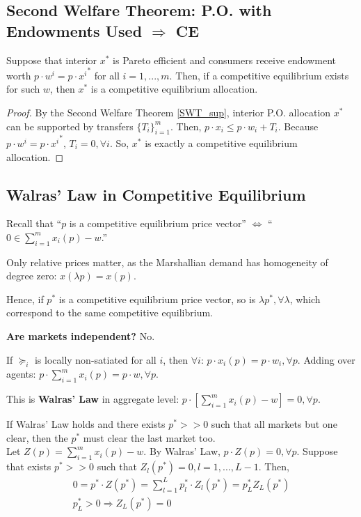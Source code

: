 \documentclass[11pt]{elegantbook}
\begin{document}
\subsection{Second Welfare Theorem: P.O. with Endowments Used $\Rightarrow$ CE}
\begin{theorem}
    Suppose that interior $x^*$ is Pareto efficient and consumers receive endowment worth $p\cdot w^i=p\cdot {x^i}^*$ for all $i=1,...,m$. Then, if a competitive equilibrium exists for such $w$, then $x^*$ is a competitive equilibrium allocation.
\end{theorem}
\begin{proof}
    By the Second Welfare Theorem \ref{SWT_sup}, interior P.O. allocation $x^*$ can be supported by transfers $\{T_i\}_{i=1}^m$. Then, $p\cdot x_i\leq p\cdot w_i + T_i$. Because $p\cdot w^i=p\cdot {x^i}^*$, $T_i=0,\forall i$. So, $x^*$ is exactly a competitive equilibrium allocation.
\end{proof}

\subsection{Walras' Law in Competitive Equilibrium}
Recall that ``$p$ is a competitive equilibrium price vector'' $\Leftrightarrow$ ``$0\in \sum_{i=1}^m x_i(p)-w$.''

\begin{note}
Only relative prices matter, as the Marshallian demand has homogeneity of degree zero: $x(\lambda p)=x(p)$.
\end{note}

Hence, if $p^*$ is a competitive equilibrium price vector, so is $\lambda p^*, \forall \lambda$, which correspond to the same competitive equilibrium.

\begin{remark}
    \textbf{Are markets independent?} No.
\end{remark}

If $\succeq_i$ is locally non-satiated for all $i$, then $\forall i$: $p\cdot x_i(p)=p\cdot w_i, \forall p$. Adding over agents: $p\cdot \sum_{i=1}^mx_i(p)=p\cdot w, \forall p$.

This is \textbf{Walras' Law} in aggregate level: $p\cdot \left[\sum_{i=1}^mx_i(p)-w\right]=0, \forall p$.

\begin{remark}
    If Walras' Law holds and there exists $p^*>>0$ such that all markets but one clear, then the $p^*$ must clear the last market too.\\
    Let $Z(p)=\sum_{i=1}^mx_i(p)-w$. By Walras' Law, $p\cdot Z(p)=0, \forall p$. Suppose that exists $p^*>>0$ such that $Z_l(p^*)=0,l=1,...,L-1$. Then,
    \begin{equation}
        \begin{aligned}
            0=p^*\cdot Z(p^*)=\sum_{l=1}^Lp_l^*\cdot Z_l(p^*)=p^*_LZ_L(p^*)\\
            p_L^*>0 \Rightarrow Z_L(p^*)=0
        \end{aligned}
        \nonumber
    \end{equation}
\end{remark}
\end{document}
